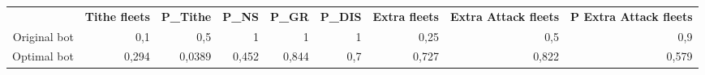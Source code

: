 \begin{tabular}{rrrrrrrrr}

           & {\bf Tithe fleets} & {\bf P_Tithe} & {\bf P_NS} & {\bf P_GR} & {\bf P_DIS} & {\bf Extra fleets} & {\bf Extra Attack fleets} & {\bf P Extra Attack fleets} \\

Original bot &        0,1 &        0,5 &          1 &          1 &          1 &       0,25 &        0,5 &        0,9 \\

Optimal bot &      0,294 &     0,0389 &      0,452 &      0,844 &        0,7 &      0,727 &      0,822 &      0,579 \\

\end{tabular}  
